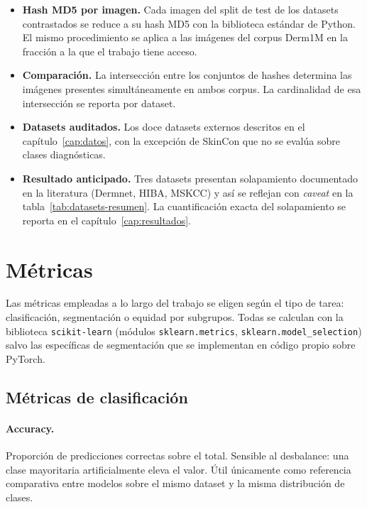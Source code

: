 \begin{itemize}
\item \textbf{Hash MD5 por imagen.} Cada imagen del split de test
de los datasets contrastados se reduce a su hash MD5 con la
biblioteca estándar de Python. El mismo procedimiento se aplica a
las imágenes del corpus Derm1M en la fracción a la que el trabajo
tiene acceso.
\item \textbf{Comparación.} La intersección entre los conjuntos
de hashes determina las imágenes presentes simultáneamente en
ambos corpus. La cardinalidad de esa intersección se reporta por
dataset.
\item \textbf{Datasets auditados.} Los doce datasets externos
descritos en el capítulo~\ref{cap:datos}, con la excepción de
SkinCon que no se evalúa sobre clases diagnósticas.
\item \textbf{Resultado anticipado.} Tres datasets presentan
solapamiento documentado en la literatura (Dermnet, HIBA, MSKCC) y
así se reflejan con \emph{caveat} en la
tabla~\ref{tab:datasets-resumen}. La cuantificación exacta del
solapamiento se reporta en el capítulo~\ref{cap:resultados}.
\end{itemize}

\section{Métricas}
\label{sec:metricas-cap4}

Las métricas empleadas a lo largo del trabajo se eligen según el
tipo de tarea: clasificación, segmentación o equidad por
subgrupos. Todas se calculan con la biblioteca \texttt{scikit-learn}
(módulos \texttt{sklearn.metrics}, \texttt{sklearn.model\_selection})
salvo las específicas de segmentación que se implementan en código
propio sobre PyTorch.

\subsection{Métricas de clasificación}
\label{sec:metricas-clasif}

\paragraph{Accuracy.} Proporción de predicciones correctas sobre
el total. Sensible al desbalance: una clase mayoritaria
artificialmente eleva el valor. Útil únicamente como referencia
comparativa entre modelos sobre el mismo dataset y la misma
distribución de clases.

